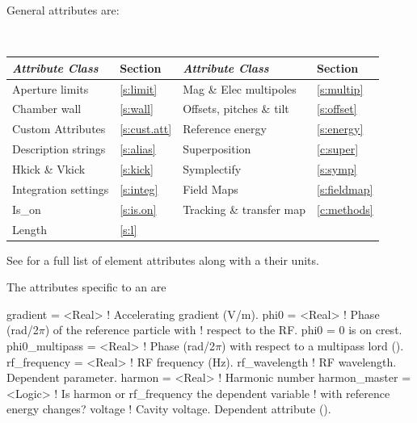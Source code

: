 General  attributes are:
\begin{center}
\tt
\begin{tabular}{llll} \toprule
  {\sl Attribute Class}      & Section           & {\sl Attribute Class}      & Section            \\ \midrule
  Aperture limits            & \ref{s:limit}     & Mag \& Elec multipoles     & \ref{s:multip}     \\
  Chamber wall               & \ref{s:wall}      & Offsets, pitches \& tilt   & \ref{s:offset}     \\
  Custom Attributes          & \ref{s:cust.att}  & Reference energy           & \ref{s:energy}     \\ 
  Description strings        & \ref{s:alias}     & Superposition              & \ref{c:super}      \\
  Hkick \& Vkick             & \ref{s:kick}      & Symplectify                & \ref{s:symp}       \\
  Integration settings       & \ref{s:integ}     & Field Maps                 & \ref{s:fieldmap}   \\
  Is_on                      & \ref{s:is.on}     & Tracking \& transfer map   & \ref{c:methods}    \\
  Length                     & \ref{s:l}         &                            &                    \\
  \bottomrule
\end{tabular}
\end{center}
\toffset
See  for a full list of element attributes along with a their units.

The attributes specific to an  are 
\begin{example}
  gradient        = <Real>    ! Accelerating gradient (V/m).
  phi0            = <Real>    ! Phase (rad/2\(\pi\)) of the reference particle with 
                              !   respect to the RF. phi0 = 0 is on crest.
  phi0_multipass  = <Real>    ! Phase (rad/2\(\pi\)) with respect to a multipass lord ().
  rf_frequency    = <Real>    ! RF frequency (Hz).
  rf_wavelength               ! RF wavelength. Dependent parameter.
  harmon          = <Real>    ! Harmonic number
  harmon_master   = <Logic>   ! Is harmon or rf_frequency the dependent variable
                              !   with reference energy changes?
  voltage                     ! Cavity voltage. Dependent attribute ().
\end{example}

